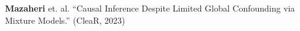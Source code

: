 \documentclass[preview]{standalone}
\begin{document}
\begin{center}
\textbf{Mazaheri} et. al. ``Causal Inference Despite Limited Global Confounding via Mixture Models.'' (CleaR, 2023)
\end{center}
\end{document}
